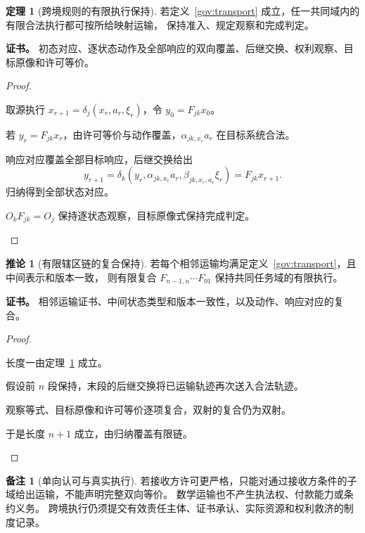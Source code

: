 \documentclass[UTF8,12pt,a4paper,openany,fontset=none,zihao=false]{ctexrep}
\theoremstyle{definition}
\newtheorem{theorem}{定理}[chapter]
\newtheorem{corollary}{推论}[chapter]
\newtheorem{remark}{备注}[chapter]
\newenvironment{certificate}{\par\noindent\textbf{证书。}\ignorespaces}{\par}
\newcommand{\1}{\mathbf 1}
\begin{document}
\begin{theorem}[跨境规则的有限执行保持]
\label{gov:finite-transport}
若定义~\ref{gov:transport} 成立，任一共同域内的有限合法执行都可按所给映射运输，
保持准入、规定观察和完成判定。
\end{theorem}
\begin{certificate}
初态对应、逐状态动作及全部响应的双向覆盖、后继交换、权利观察、目标原像和许可等价。
\end{certificate}
\begin{proof}
\begin{semanticsteps}
\item 取源执行 \(x_{r+1}=\delta_j(x_r,a_r,\xi_r)\)，令 \(y_0=F_{jk}x_0\)。
\item 若 \(y_r=F_{jk}x_r\)，由许可等价与动作覆盖，\(\alpha_{jk,x_r}a_r\) 在目标系统合法。
\item 响应对应覆盖全部目标响应，后继交换给出
\[
y_{r+1}
=\delta_k(y_r,\alpha_{jk,x_r}a_r,\beta_{jk,x_r,a_r}\xi_r)
=F_{jk}x_{r+1}.
\]
归纳得到全部状态对应。
\item \(O_kF_{jk}=O_j\) 保持逐状态观察，目标原像式保持完成判定。
\end{semanticsteps}
\end{proof}

\begin{corollary}[有限辖区链的复合保持]
\label{gov:composition}
若每个相邻运输均满足定义~\ref{gov:transport}，且中间表示和版本一致，
则有限复合 \(F_{n-1,n}\cdots F_{01}\) 保持共同任务域的有限执行。
\end{corollary}
\begin{certificate}
相邻运输证书、中间状态类型和版本一致性，以及动作、响应对应的复合。
\end{certificate}
\begin{proof}
\begin{semanticsteps}
\item 长度一由定理~\ref{gov:finite-transport} 成立。
\item 假设前 \(n\) 段保持，末段的后继交换将已运输轨迹再次送入合法轨迹。
\item 观察等式、目标原像和许可等价逐项复合，双射的复合仍为双射。
\item 于是长度 \(n+1\) 成立，由归纳覆盖有限链。
\end{semanticsteps}
\end{proof}

\begin{remark}[单向认可与真实执行]
若接收方许可更严格，只能对通过接收方条件的子域给出运输，不能声明完整双向等价。
数学运输也不产生执法权、付款能力或条约义务。
跨境执行仍须提交有效责任主体、证书承认、实际资源和权利救济的制度记录。
\end{remark}
\end{document}
